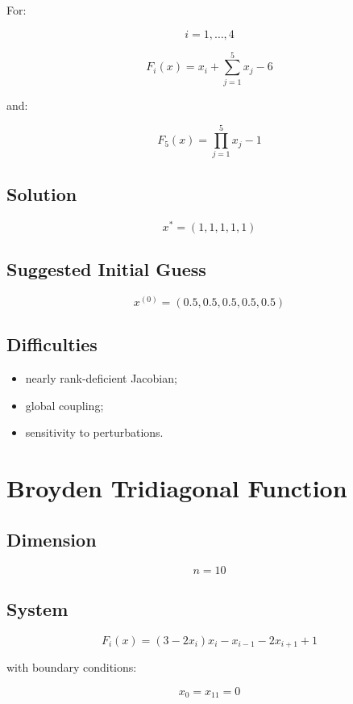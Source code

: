 \documentclass[11pt,a4paper]{article}
\begin{document}
For:

\[
i=1,\dots,4
\]

\[
F_i(x)=x_i+\sum_{j=1}^5 x_j -6
\]

and:

\[
F_5(x)=\prod_{j=1}^5 x_j -1
\]

\subsection*{Solution}

\[
x^*=(1,1,1,1,1)
\]

\subsection*{Suggested Initial Guess}

\[
x^{(0)}=(0.5,0.5,0.5,0.5,0.5)
\]

\subsection*{Difficulties}

\begin{itemize}
  \item nearly rank-deficient Jacobian;
  \item global coupling;
  \item sensitivity to perturbations.
\end{itemize}

\section{Broyden Tridiagonal Function}

\subsection*{Dimension}

\[
n=10
\]

\subsection*{System}

\[
F_i(x)=
(3-2x_i)x_i
-x_{i-1}
-2x_{i+1}
+1
\]

with boundary conditions:

\[
x_0=x_{11}=0
\]
\end{document}
